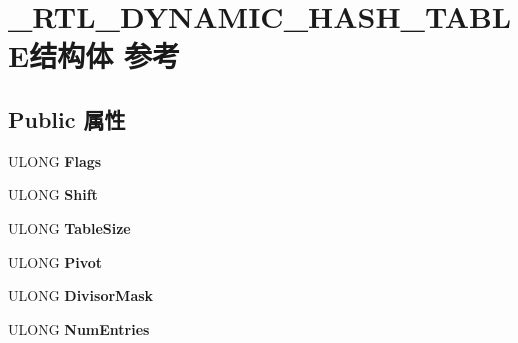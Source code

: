 \hypertarget{struct___r_t_l___d_y_n_a_m_i_c___h_a_s_h___t_a_b_l_e}{}\section{\+\_\+\+R\+T\+L\+\_\+\+D\+Y\+N\+A\+M\+I\+C\+\_\+\+H\+A\+S\+H\+\_\+\+T\+A\+B\+L\+E结构体 参考}
\label{struct___r_t_l___d_y_n_a_m_i_c___h_a_s_h___t_a_b_l_e}
\subsection*{Public 属性}
\begin{DoxyCompactItemize}
\item 
\mbox{\label{struct___r_t_l___d_y_n_a_m_i_c___h_a_s_h___t_a_b_l_e_a7237922e540fe1179623bf8858f6f23d}} 
U\+L\+O\+NG {\bfseries Flags}
\item 
\mbox{\label{struct___r_t_l___d_y_n_a_m_i_c___h_a_s_h___t_a_b_l_e_a8542948856d578c9eae186f8ae9412e4}} 
U\+L\+O\+NG {\bfseries Shift}
\item 
\mbox{\label{struct___r_t_l___d_y_n_a_m_i_c___h_a_s_h___t_a_b_l_e_a43bbf674c1f1716701eb168414b5ad6d}} 
U\+L\+O\+NG {\bfseries Table\+Size}
\item 
\mbox{\label{struct___r_t_l___d_y_n_a_m_i_c___h_a_s_h___t_a_b_l_e_a7dae0b436c4b9722627cf1e994d8964a}} 
U\+L\+O\+NG {\bfseries Pivot}
\item 
\mbox{\label{struct___r_t_l___d_y_n_a_m_i_c___h_a_s_h___t_a_b_l_e_a86e8437b664b71e244fbc98f24939aef}} 
U\+L\+O\+NG {\bfseries Divisor\+Mask}
\item 
\mbox{\label{struct___r_t_l___d_y_n_a_m_i_c___h_a_s_h___t_a_b_l_e_acfb438f86d3fa763d19d1c621efc1c1a}} 
U\+L\+O\+NG {\bfseries Num\+Entries}
\item 
\mbox{\label{struct___r_t_l___d_y_n_a_m_i_c___h_a_s_h___t_a_b_l_e_aaa4b578bc44100f8a517a626f9fcb216}} 

\end{DoxyCompactItemize}
